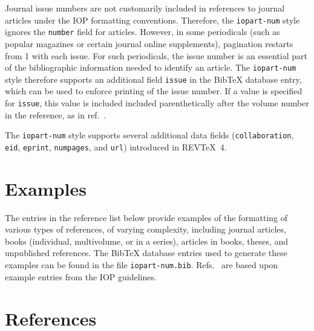 \documentclass[12pt]{iopart}
\newcommand{\BibTeX}{Bib\TeX}
\newcommand{\REVTeX}{REV\TeX}
\begin{document}
Journal issue numbers are not customarily included in references to
journal articles under the IOP formatting conventions.
Therefore, the
\texttt{iopart-num} style ignores the
\verb+number+ field for articles.  
However, in some periodicals (such as popular magazines or certain
journal online supplements), pagination restarts from 1 with each
issue.  For such periodicals, the issue number is an essential part of
the bibliographic information needed to identify an article.  The
\texttt{iopart-num} style therefore supports an additional field
\verb+issue+ in the \BibTeX{} database entry, which can be used to 
enforce printing of the issue number.  If a value is specified for
\verb+issue+, this value is included included parenthetically after the volume
number in the reference, as in
ref.~\cite{zamfir2005:132te-beta-enam04}.

The \texttt{iopart-num} style supports several additional data fields
(\verb+collaboration+, \verb+eid+, \verb+eprint+, 
\verb+numpages+, and \verb+url+) introduced in
\REVTeX{}~4.


\section{Examples}

The entries in the reference list below provide examples of the
formatting of various types of references, of varying complexity,
including journal articles, books (individual, multivolume, or in a
series), articles in books, theses, and unpublished references.  The
\BibTeX{} database entries used to generate these examples can be
found in the file \texttt{iopart-num.bib}.
Refs.~\cite{ex1,ex2,ex3,ex4,ex5,ex6,ex7,ex8} are based upon example entries
from the IOP guidelines.

\section*{References}

\end{document}

